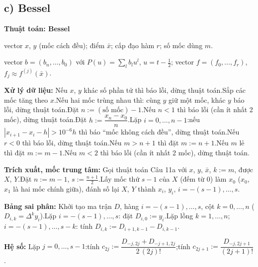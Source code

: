 \documentclass[11pt,a4paper]{article}
\newenvironment{thuattoan}[1]
  {\par\medskip\noindent\textbf{Thuật toán: #1}\begin{description}[style=standard,align=left,leftmargin=4.3em,labelwidth=3.9em,labelsep=0.4em,itemsep=1pt,topsep=3pt,font=\normalfont\bfseries]}
  {\end{description}}
\newcommand{\thut}{\newline\hspace*{1.2em}}
\begin{document}
\subsection{c) Bessel}
\begin{thuattoan}{Bessel}
\item[Input:] vector $x$, $y$ (mốc cách đều); điểm $\bar x$; cấp đạo hàm $r$; số mốc dùng $m$.
\item[Output:] vector $b=(b_n,\dots,b_0)$ với $P(u)=\sum_lb_lu^l$, $u=t-\frac12$; vector $f=(f_0,\dots,f_r)$, $f_j\approx f^{(j)}(\bar x)$.
\item[Bước 0:] \textbf{Xử lý dữ liệu:} Nếu $x$, $y$ khác số phần tử thì báo lỗi, dừng thuật toán.\newline Sắp các mốc tăng theo $x$.\newline Nếu hai mốc trùng nhau thì: cùng $y$ giữ một mốc, khác $y$ báo lỗi, dừng thuật toán.\newline Đặt $n:=(\text{số mốc})-1$.\newline Nếu $n<1$ thì báo lỗi (cần ít nhất 2 mốc), dừng thuật toán.\newline Đặt $h:=\dfrac{x_n-x_0}{n}$.\newline Lặp $i=0,\dots,n-1$:\thut nếu $|x_{i+1}-x_i-h|>10^{-6}h$ thì báo ``mốc không cách đều'', dừng thuật toán.\newline Nếu $r<0$ thì báo lỗi, dừng thuật toán.\newline Nếu $m>n+1$ thì đặt $m:=n+1$.\newline Nếu $m$ lẻ thì đặt $m:=m-1$.\newline Nếu $m<2$ thì báo lỗi (cần ít nhất 2 mốc), dừng thuật toán.
\item[Bước 1:] \textbf{Trích xuất, mốc trung tâm:} Gọi thuật toán Câu 11a với $x$, $y$, $\bar x$, $k:=m$, được $X$, $Y$.\newline Đặt $n:=m-1$, $s:=\frac{n+1}{2}$.\newline Lấy mốc thứ $s-1$ của $X$ (đếm từ $0$) làm $x_0$ ($x_0$, $x_1$ là hai mốc chính giữa), đánh số lại $X$, $Y$ thành $x_i$, $y_i$, $i=-(s-1),\dots,s$.
\item[Bước 2:] \textbf{Bảng sai phân:} Khởi tạo ma trận $D$, hàng $i=-(s-1),\dots,s$, cột $k=0,\dots,n$ ($D_{i,k}=\Delta^ky_i$).\newline Lặp $i=-(s-1),\dots,s$: đặt $D_{i,0}:=y_i$.\newline Lặp lồng $k=1,\dots,n$; $i=-(s-1),\dots,s-k$: tính $D_{i,k}:=D_{i+1,k-1}-D_{i,k-1}$.
\item[Bước 3:] \textbf{Hệ số:} Lặp $j=0,\dots,s-1$:\thut tính $c_{2j}:=\dfrac{D_{-j,2j}+D_{-j+1,2j}}{2\,(2j)!}$;\thut tính $c_{2j+1}:=\dfrac{D_{-j,2j+1}}{(2j+1)!}$.

\end{thuattoan}
\end{document}
